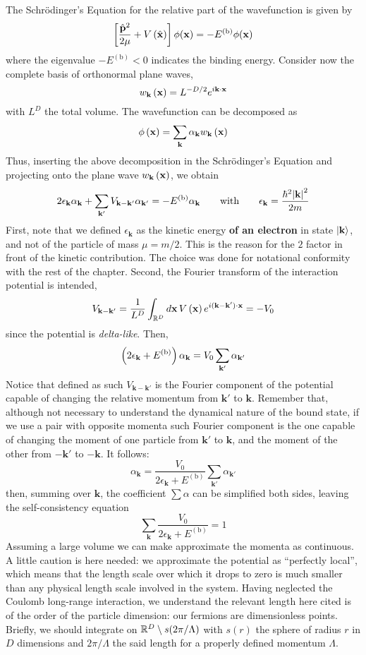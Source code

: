 The Schrödinger's Equation for the relative part of the wavefunction is given by
\[
	\left[{\frac{\hat{\mathbf{p}}^2}{2\mu} + V \left({\hat{\mathbf{x}}}\right)}\right] \phi(\mathbf{x}) = - E^{(\mathrm{b})} \phi(\mathbf{x})
\]
where the eigenvalue $- E^{(\mathrm{b})} < 0$ indicates the binding energy. Consider now the complete basis of orthonormal plane waves,
\[
	w_\mathbf{k} \left({\mathbf{x}}\right) = L^{-D/2} e^{i \mathbf{k} \cdot \mathbf{x}}
\]
with $L^D$ the total volume. The wavefunction can be decomposed as
\[
	\phi\left({\mathbf{x}}\right) = \sum_\mathbf{k} \alpha_\mathbf{k} w_\mathbf{k} \left({\mathbf{x}}\right)
\]
Thus, inserting the above decomposition in the Schrödinger's Equation and projecting onto the plane wave $w_\mathbf{k} \left({\mathbf{x}}\right)$, we obtain
\[
	2\epsilon_\mathbf{k} \alpha_\mathbf{k} + \sum_{\mathbf{k}'} V_{\mathbf{k}-\mathbf{k}'} \alpha_{\mathbf{k}'} = - E^{(\mathrm{b})} \alpha_\mathbf{k}
	\quad\qq{with}\quad
	\epsilon_\mathbf{k} = \frac{\hbar^2 \abs{\mathbf{k}}^2}{2m}
\]
First, note that we defined $\epsilon_\mathbf{k}$ as the kinetic energy \textbf{of an electron} in state $\ket{\mathbf{k}}$, and not of the particle of mass $\mu=m/2$. This is the reason for the $2$ factor in front of the kinetic contribution. The choice was done for notational conformity with the rest of the chapter. Second, the Fourier transform of the interaction potential is intended,
\[
	V_{\mathbf{k}-\mathbf{k}'} = \frac{1}{L^D} \int_{\mathbb{R}^D} d\mathbf{x} \, V \left({\mathbf{x}}\right) e^{i(\mathbf{k}-\mathbf{k}') \cdot \mathbf{x}} = - V_0
\]
since the potential is \textit{delta-like}.  Then,
\[
	\left({2\epsilon_\mathbf{k} + E^{(\mathrm{b})}}\right) \alpha_\mathbf{k} = V_0 \sum_{\mathbf{k}'} \alpha_{\mathbf{k}'}
\]
Notice that defined as such $V_{\mathbf{k}-\mathbf{k}'}$ is the Fourier component of the potential capable of changing the relative momentum from $\mathbf{k}'$ to $\mathbf{k}$. Remember that, although not necessary to understand the dynamical nature of the bound state, if we use a pair with opposite momenta such Fourier component is the one capable of changing the moment of one particle from $\mathbf{k}'$ to $\mathbf{k}$, and the moment of the other from $-\mathbf{k}'$ to $-\mathbf{k}$.
It follows:
\[
	\alpha_\mathbf{k} = \frac{V_0}{2\epsilon_\mathbf{k} + E^{(\mathrm{b})}} \sum_{\mathbf{k}'} \alpha_{\mathbf{k}'}
\]
then, summing over $\mathbf{k}$, the coefficient $\sum \alpha$ can be simplified both sides, leaving the self-consistency equation
\[
	\sum_\mathbf{k} \frac{V_0}{2\epsilon_\mathbf{k} + E^{(\mathrm{b})}} = 1
\]
Assuming a large volume we can make approximate the momenta as continuous. A little caution is here needed: we approximate the potential as ``perfectly local'', which means that the length scale over which it drops to zero is much smaller than any physical length scale involved in the system. Having neglected the Coulomb long-range interaction, we understand the relevant length here cited is of the order of the particle dimension: our fermions are dimensionless points. Briefly, we should integrate on $\mathbb{R}^D \setminus s(2\pi/\Lambda)$ with $s(r)$ the sphere of radius $r$ in $D$ dimensions and $2\pi/\Lambda$ the said length for a properly defined momentum $\Lambda$.

